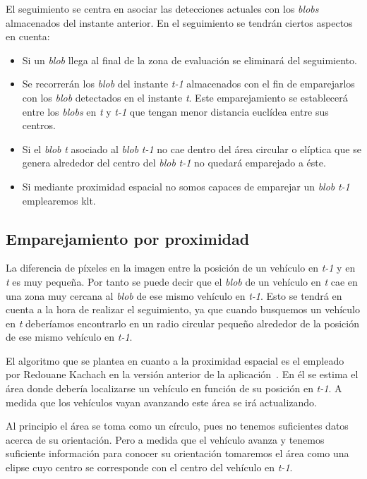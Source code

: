 El seguimiento se centra en asociar las detecciones actuales con los \textit{blobs} almacenados del instante anterior. En el seguimiento se tendrán ciertos aspectos en cuenta:

\begin{itemize}
    \item Si un \textit{blob} llega al final de la zona de evaluación se eliminará del seguimiento.
    \item Se recorrerán los \textit{blob} del instante \textit{t-1} almacenados con el fin de emparejarlos con los \textit{blob} detectados en el instante \textit{t}. Este emparejamiento se establecerá entre los \textit{blobs} en \textit{t} y \textit{t-1} que tengan menor distancia euclídea entre sus centros.
    \item Si el \textit{blob} \textit{t} asociado al \textit{blob} \textit{t-1} no cae dentro del área circular o elíptica que se genera alrededor del centro del  \textit{blob} \textit{t-1} no quedará emparejado a éste. 
    \item Si mediante proximidad espacial no somos capaces de emparejar un \textit{blob} \textit{t-1} emplearemos \acrshort{klt}.
\end{itemize}

\subsection{Emparejamiento por proximidad}

La diferencia de píxeles en la imagen entre la posición de un vehículo en \textit{t-1} y en \textit{t} es muy pequeña. Por tanto se puede decir que el \textit{blob} de un vehículo en \textit{t} cae en una zona muy cercana al \textit{blob} de ese mismo vehículo en \textit{t-1}. Esto se tendrá en cuenta a la hora de realizar el seguimiento, ya que cuando busquemos un vehículo en \textit{t} deberíamos encontrarlo en un radio circular pequeño alrededor de la posición de ese mismo vehículo en \textit{t-1}. 

El algoritmo que se plantea en cuanto a la proximidad espacial es el empleado por Redouane Kachach en la versión anterior de la aplicación~\cite{redo_tesis}. En él se estima el área donde debería localizarse un vehículo en función de su posición en \textit{t-1}. A medida que los vehículos vayan avanzando este área se irá actualizando.

Al principio el área se toma como un círculo, pues no tenemos suficientes datos acerca de su orientación. Pero a medida que el vehículo avanza y tenemos suficiente información para conocer su orientación tomaremos el área como una elipse cuyo centro se corresponde con el centro del vehículo en \textit{t-1}. 

